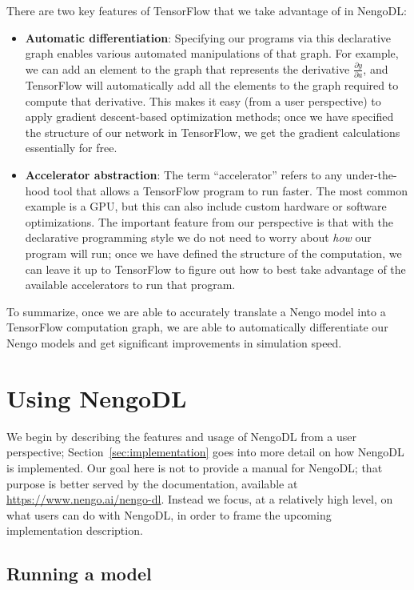 \documentclass{article}
\begin{document}
There are two key features of TensorFlow that we take advantage of in NengoDL:

\begin{itemize}
\item {\bf Automatic differentiation}: Specifying our programs via this declarative graph enables various automated manipulations of that graph.  For example, we can add an element to the graph that represents the derivative $\frac{\partial y}{\partial a}$, and TensorFlow will automatically add all the elements to the graph required to compute that derivative.  This makes it easy (from a user perspective) to apply gradient descent-based optimization methods; once we have specified the structure of our network in TensorFlow, we get the gradient calculations essentially for free.
\item {\bf Accelerator abstraction}: The term ``accelerator'' refers to any under-the-hood tool that allows a TensorFlow program to run faster.  The most common example is a GPU, but this can also include custom hardware or software optimizations.  The important feature from our perspective is that with the declarative programming style we do not need to worry about \emph{how} our program will run; once we have defined the structure of the computation, we can leave it up to TensorFlow to figure out how to best take advantage of the available accelerators to run that program.
\end{itemize}

To summarize, once we are able to accurately translate a Nengo model into a TensorFlow computation graph, we are able to automatically differentiate our Nengo models and get significant improvements in simulation speed.

\section{Using NengoDL}
\label{sec:usage}

We begin by describing the features and usage of NengoDL from a user perspective; Section~\ref{sec:implementation} goes into more detail on how NengoDL is implemented.  Our goal here is not to provide a manual for NengoDL; that purpose is better served by the documentation, available at \url{https://www.nengo.ai/nengo-dl}.  Instead we focus, at a relatively high level, on what users can do with NengoDL, in order to frame the upcoming implementation description.

\subsection{Running a model}
\label{sec:running}
\end{document}
